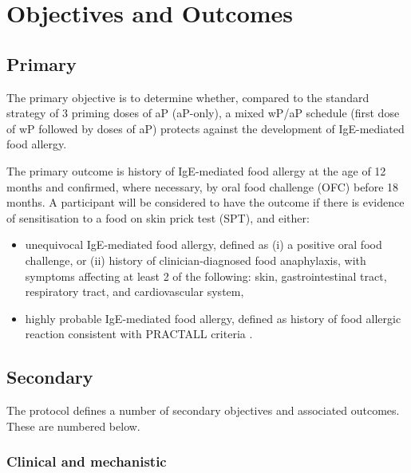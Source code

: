 \documentclass{bmcart}
\begin{document}
\section*{Objectives and Outcomes}

\subsection*{Primary}

The primary objective is to determine whether, compared to the standard strategy of 3 priming doses of aP (aP-only), a mixed wP/aP schedule (first dose of wP followed by doses of aP) protects against the development of IgE-mediated food allergy.

The primary outcome is history of IgE-mediated food allergy at the age of 12 months and confirmed, where necessary, by oral food challenge (OFC) before 18 months.
A participant will be considered to have the outcome if there is evidence of sensitisation to a food on skin prick test (SPT), and either:
\begin{itemize}
	\item unequivocal IgE-mediated food allergy, defined as (i) a positive oral food challenge, or (ii) history of clinician-diagnosed food anaphylaxis, with symptoms affecting at least 2 of the following: skin, gastrointestinal tract, respiratory tract, and cardiovascular system,
	\item highly probable IgE-mediated food allergy, defined as history of food allergic reaction consistent with PRACTALL criteria \cite{sampson2012standardizing}.
\end{itemize}

\subsection*{Secondary}

The protocol defines a number of secondary objectives and associated outcomes.
These are numbered below.

\subsubsection*{Clinical and mechanistic}
\end{document}
